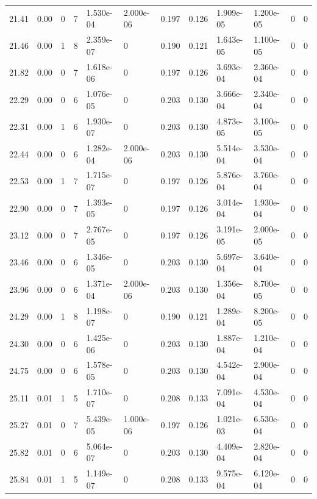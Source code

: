 \documentclass[preview]{standalone}
\begin{document}
{{{\begin{tabular}{L{1.2cm}C{1.2cm} C{0.3cm}C{0.5cm} C{1.4cm}C{1.4cm} C{1.4cm}C{1.4cm} C{1.6cm}C{1.6cm} C{1.6cm}C{1.6cm}}
  21.41  &  0.00  & 0     &  7 &  1.530e-04  & 2.000e-06  &  0.197&   0.126& 1.909e-05 & 1.200e-05   &  0 & 0  \\ 
  21.46  &  0.00  & 1     &  8 &  2.359e-07  & 0  &  0.190&   0.121& 1.643e-05 & 1.100e-05   &  0 & 0  \\ 
  21.82  &  0.00  & 0     &  7 &  1.618e-06  & 0  &  0.197&   0.126& 3.693e-04 & 2.360e-04   &  0 & 0  \\ 
  22.29  &  0.00  & 0     &  6 &  1.076e-05  & 0  &  0.203&   0.130& 3.666e-04 & 2.340e-04   &  0 & 0  \\ 
  22.31  &  0.00  & 1     &  6 &  1.930e-07  & 0  &  0.203&   0.130& 4.873e-05 & 3.100e-05   &  0 & 0  \\ 
  22.44  &  0.00  & 0     &  6 &  1.282e-04  & 2.000e-06  &  0.203&   0.130& 5.514e-04 & 3.530e-04   &  0 & 0  \\ 
  22.53  &  0.00  & 1     &  7 &  1.715e-07  & 0  &  0.197&   0.126& 5.876e-04 & 3.760e-04   &  0 & 0  \\ 
  22.90  &  0.00  & 0     &  7 &  1.393e-05  & 0  &  0.197&   0.126& 3.014e-04 & 1.930e-04   &  0 & 0  \\ 
  23.12  &  0.00  & 0     &  7 &  2.767e-05  & 0  &  0.197&   0.126& 3.191e-05 & 2.000e-05   &  0 & 0  \\ 
  23.46  &  0.00  & 0     &  6 &  1.346e-05  & 0  &  0.203&   0.130& 5.697e-04 & 3.640e-04   &  0 & 0  \\ 
  23.96  &  0.00  & 0     &  6 &  1.371e-04  & 2.000e-06  &  0.203&   0.130& 1.356e-04 & 8.700e-05   &  0 & 0  \\ 
  24.29  &  0.00  & 1     &  8 &  1.198e-07  & 0  &  0.190&   0.121& 1.289e-04 & 8.200e-05   &  0 & 0  \\ 
  24.30  &  0.00  & 0     &  6 &  1.425e-06  & 0  &  0.203&   0.130& 1.887e-04 & 1.210e-04   &  0 & 0  \\ 
  24.75  &  0.00  & 0     &  6 &  1.578e-05  & 0  &  0.203&   0.130& 4.542e-04 & 2.900e-04   &  0 & 0  \\ 
  25.11  &  0.01  & 1     &  5 &  1.710e-07  & 0  &  0.208&   0.133& 7.091e-04 & 4.530e-04   &  0 & 0  \\ 
  25.27  &  0.01  & 0     &  7 &  5.439e-05  & 1.000e-06  &  0.197&   0.126& 1.021e-03 & 6.530e-04   &  0 & 0  \\ 
  25.82  &  0.01  & 0     &  6 &  5.064e-07  & 0  &  0.203&   0.130& 4.409e-04 & 2.820e-04   &  0 & 0  \\ 
  25.84  &  0.01  & 1     &  5 &  1.149e-07  & 0  &  0.208&   0.133& 9.575e-04 & 6.120e-04   &  0 & 0  \\ 

\end{tabular}}}}
\end{document}
